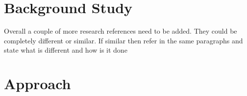 \documentclass[a4paper, 11pt]{article}
\begin{document}
\color{red}
\section{Background Study}
Overall a couple of more research references need to be added. They could be completely different or similar. If similar then refer in the same paragraphs and state what is different and how is it done
\color{black}

\section{Approach}







  




\end{document}
